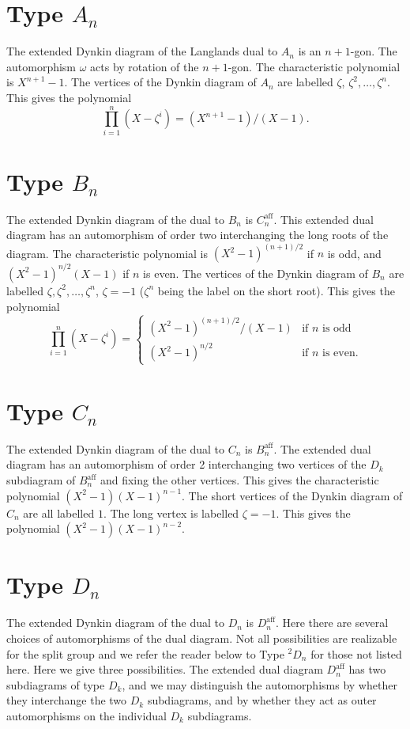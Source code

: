 \documentclass[11pt]{amsart}
\theoremstyle{plain}
\theoremstyle{definition}
\def\aff{\operatorname{aff}}
\begin{document}
\section{Type $A_n$}
The extended Dynkin diagram of the Langlands dual to $A_n$ is an
$n+1$-gon.  The automorphism $\omega$ acts by rotation of the $n+1$-gon.
The characteristic polynomial is $X^{n+1}-1$.  The vertices of the
Dynkin diagram of $A_n$ are labelled $\zeta$, $\zeta^2,\ldots,\zeta^n$.
This gives the polynomial $$\prod_{i=1}^n(X-\zeta^i) = (X^{n+1}-1)/(X-1).$$

\section{Type $B_n$}
The extended Dynkin diagram of the dual to $B_n$ is $C_n^{\aff}$.  This extended
dual
diagram has an automorphism of order two interchanging the long roots
of the diagram.  The characteristic polynomial is $(X^2-1)^{(n+1)/2}$ if
$n$ is odd, and $(X^2-1)^{n/2}(X-1)$ if $n$ is even.  The vertices
of the Dynkin diagram of $B_n$ are labelled $\zeta,\zeta^2,\ldots,\zeta^n$,
$\zeta=-1$ ($\zeta^n$ being the label on the short root).  This gives
the polynomial
$$\prod_{i=1}^n (X-\zeta^i) = \begin{cases} (X^2-1)^{(n+1)/2}/(X-1) & \text{if $n$ is odd}\\
				(X^2-1)^{n/2}& \text{if $n$ is even.}\end{cases}
$$
\section{Type $C_n$}
The extended Dynkin diagram of the dual to $C_n$ is $B_n^{\aff}$.  The
extended dual
diagram has an automorphism of order 2 interchanging two vertices
of the $D_k$ subdiagram of $B_n^{\aff}$ and fixing the other vertices.
This gives the characteristic polynomial $(X^2-1)(X-1)^{n-1}$.
The short vertices of the Dynkin diagram of $C_n$ are all labelled $1$.
The long vertex is labelled $\zeta=-1$.  This gives the polynomial
$(X^2-1)(X-1)^{n-2}$.

\section{Type $D_n$}
The extended Dynkin diagram of the dual to $D_n$ is $D_n^{\aff}$.  Here there
are several choices of automorphisms of the dual diagram.  Not all possibilities
are realizable for the split group and we refer the reader below to
Type ${}^2D_n$ for those not listed here.   Here we give three possibilities.
The extended dual diagram $D_n^{\aff}$ has two subdiagrams of type $D_k$, and
we may distinguish the automorphisms by whether they interchange the two
$D_k$ subdiagrams, and by whether they act as outer automorphisms on the
individual $D_k$ subdiagrams.
\end{document}
